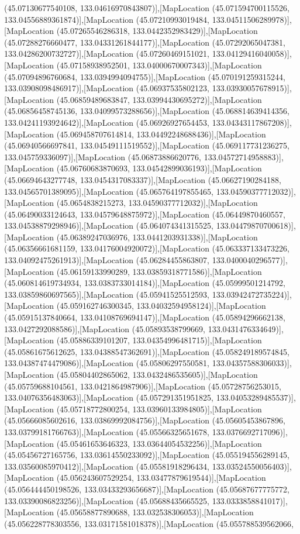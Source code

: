 (45.07130677540108, 133.04616970843807)],[MapLocation (45.071594700115526, 133.04556889361874)],[MapLocation (45.07210993019484, 133.04511506289978)],[MapLocation (45.07265546286318, 133.0442352983429)],[MapLocation (45.07288276660477, 133.04331261844177)],[MapLocation (45.07292065047381, 133.04286200732727)],[MapLocation (45.07260469151021, 133.04129416040058)],[MapLocation (45.07158938952501, 133.04000670007343)],[MapLocation (45.07094896760684, 133.0394994094755)],[MapLocation (45.070191259315244, 133.03908098486917)],[MapLocation (45.06937535802123, 133.03930057678915)],[MapLocation (45.06859489683847, 133.03994430695272)],[MapLocation (45.06856458745136, 133.04099573288656)],[MapLocation (45.068814639414356, 133.04241193924642)],[MapLocation (45.06926927654453, 133.04343117867208)],[MapLocation (45.069458707614814, 133.04492248688436)],[MapLocation (45.06940566697841, 133.04549111519552)],[MapLocation (45.069117731236275, 133.045759336097)],[MapLocation (45.06873886620776, 133.04572714958883)],[MapLocation (45.06760683870693, 133.04542899036193)],[MapLocation (45.06694643277748, 133.0454317083337)],[MapLocation (45.06627190284188, 133.04565701389095)],[MapLocation (45.065764197855465, 133.04590377712032)],[MapLocation (45.0654838215273, 133.04590377712032)],[MapLocation (45.06490033124643, 133.04579648875972)],[MapLocation (45.06449870460557, 133.04538879298946)],[MapLocation (45.064074341315525, 133.04479870700618)],[MapLocation (45.06389247036976, 133.0441203931338)],[MapLocation (45.06356661681159, 133.04176004920072)],[MapLocation (45.063337133473226, 133.04092475261913)],[MapLocation (45.06284455863807, 133.0400040296577)],[MapLocation (45.06159133990289, 133.03859318771586)],[MapLocation (45.060814619734934, 133.0383733014184)],[MapLocation (45.05999501214792, 133.03859860697565)],[MapLocation (45.05941525512593, 133.03942472735224)],[MapLocation (45.059162746300345, 133.04032594958124)],[MapLocation (45.05915137840664, 133.04108769694147)],[MapLocation (45.05894296662138, 133.0427292088586)],[MapLocation (45.05893538799669, 133.0431476334649)],[MapLocation (45.05886339101207, 133.04354996481715)],[MapLocation (45.05861675612625, 133.04388547362691)],[MapLocation (45.058249189574845, 133.04387474479086)],[MapLocation (45.05806297550581, 133.04357588306033)],[MapLocation (45.05804402865062, 133.0432486535605)],[MapLocation (45.05759688104561, 133.0421864987906)],[MapLocation (45.05728756253015, 133.04076356483063)],[MapLocation (45.057291351951825, 133.04053289485537)],[MapLocation (45.05718772800254, 133.03960133984805)],[MapLocation (45.05666085602616, 133.03869992084756)],[MapLocation (45.05605453867896, 133.03799181766763)],[MapLocation (45.05566325651678, 133.0376692717096)],[MapLocation (45.05461653646323, 133.03644054532256)],[MapLocation (45.05456727165756, 133.03614550233092)],[MapLocation (45.055194556289145, 133.03560085970412)],[MapLocation (45.05581918296434, 133.03524550056403)],[MapLocation (45.056243607529254, 133.03477879619544)],[MapLocation (45.056444450198526, 133.03433293656687)],[MapLocation (45.05687677775772, 133.03390086823256)],[MapLocation (45.05688435665525, 133.0333858841017)],[MapLocation (45.05658877890688, 133.032538306053)],[MapLocation (45.056228778303556, 133.03171581018378)],[MapLocation (45.055788539562066, 